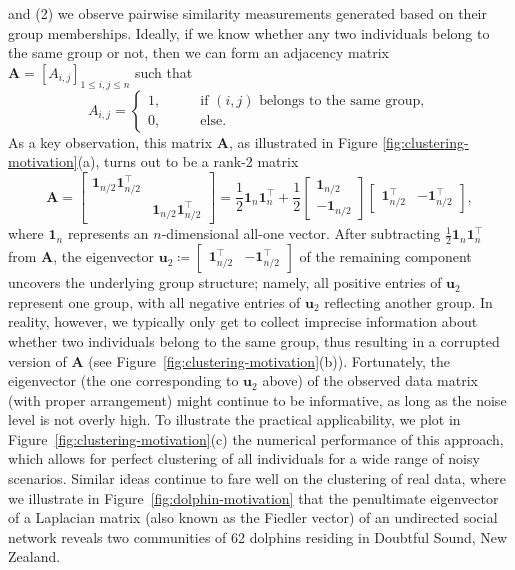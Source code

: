 and (2) we observe pairwise similarity measurements generated based on their group memberships.
Ideally, if we know whether any two individuals belong to the same group or not, then we can form an adjacency matrix $\bm{A}=[A_{i,j}]_{1\leq i,j\leq n}$ such that
%
\begin{equation}
	A_{i,j}=\begin{cases}
1,\qquad & \text{if }(i,j)\text{ belongs to the same group},\\
0, & \text{else}.
\end{cases}
	\label{eq:defn-A-motivation-CD}
\end{equation}
%
As a key observation, this matrix $\bm{A}$, as illustrated in Figure \ref{fig:clustering-motivation}(a), turns out to be a rank-2 matrix
%
\[
	\bm{A} =
	\left[\begin{array}{cc}
		\bm{1}_{n/2}\bm{1}^{\top}_{n/2}\\
 & \bm{1}_{n/2}\bm{1}^{\top}_{n/2}
\end{array}\right]=\frac{1}{2}\bm{1}_{n}\bm{1}^{\top}_{n} + \frac{1}{2}\left[\begin{array}{c}
\bm{1}_{n/2}\\
-\bm{1}_{n/2}
\end{array}\right]\left[\begin{array}{cc}
\bm{1}^{\top}_{n/2} & -\bm{1}^{\top}_{n/2}\end{array}\right],
\]
%
where $\bm{1}_n$ represents an $n$-dimensional all-one vector. 
After subtracting $\frac{1}{2}\bm{1}_{n}\bm{1}^{\top}_{n}$ from $\bm{A}$, the eigenvector $\bm{u}_2\coloneqq [\begin{array}{cc}
\bm{1}^{\top}_{n/2} & -\bm{1}^{\top}_{n/2}\end{array}]$ of the remaining component uncovers the underlying group structure; namely, all positive entries of $\bm{u}_2$ represent one group, with all negative entries of $\bm{u}_2$  reflecting another group.
In reality, however, we typically only get to collect imprecise information about whether two individuals belong to the same group,
thus resulting in a corrupted version of $\bm{A}$ (see Figure~\ref{fig:clustering-motivation}(b)). Fortunately, the eigenvector (the one corresponding to $\bm{u}_2$ above) of the observed data matrix (with proper arrangement) might continue to be informative, as long as the noise level is not overly high.
To illustrate the practical applicability, we plot in Figure~\ref{fig:clustering-motivation}(c) the numerical performance of this approach, which allows for perfect clustering of all individuals  for a wide range of noisy scenarios. Similar ideas continue to fare well on the clustering of real data, where we illustrate in Figure~\ref{fig:dolphin-motivation} that the penultimate eigenvector of a Laplacian matrix (also known as the Fiedler vector) of an undirected social network reveals  two communities of 62 dolphins residing in Doubtful Sound, New Zealand.


